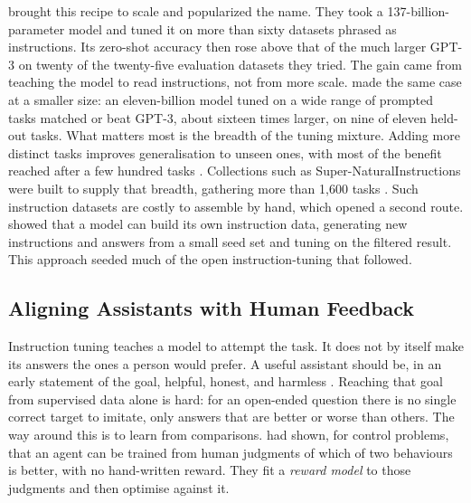 \citet{wei2022flan} brought this recipe to scale and popularized the name. They took a 137-billion-parameter
model and tuned it on more than sixty datasets phrased as instructions. Its zero-shot
accuracy then rose above that of the much larger GPT-3 on twenty of the twenty-five
evaluation datasets they tried. The gain came from teaching the model to read
instructions, not from more scale. \citet{sanh2022t0} made the same case at a smaller
size: an eleven-billion model tuned on a wide range of prompted tasks matched or beat
GPT-3, about sixteen times larger, on nine of eleven held-out tasks. What matters most
is the breadth of the tuning mixture. Adding more distinct tasks improves
generalisation to unseen ones, with most of the benefit reached after a few hundred
tasks \citep{flan_t5}. Collections such as Super-NaturalInstructions were built to
supply that breadth, gathering more than 1{,}600 tasks \citep{wang2022supernatural}.
Such instruction datasets are costly to assemble by hand, which opened a second route.
\citet{wang2023selfinstruct} showed that a model can build its own instruction data,
generating new instructions and answers from a small seed set and tuning on the
filtered result. This approach seeded much of the open instruction-tuning that
followed.

\subsection{Aligning Assistants with Human Feedback}

Instruction tuning teaches a model to attempt the task. It does not by itself make its
answers the ones a person would prefer. A useful assistant should be, in an early
statement of the goal, helpful, honest, and harmless \citep{askell2021hhh}. Reaching
that goal from supervised data alone is hard: for an open-ended question there is no
single correct target to imitate, only answers that are better or worse than others.
The way around this is to learn from comparisons. \citet{christiano2017preferences} had
shown, for control problems, that an agent can be trained from human judgments of which
of two behaviours is better, with no hand-written reward. They fit a \emph{reward
model} to those judgments and then optimise against it.

